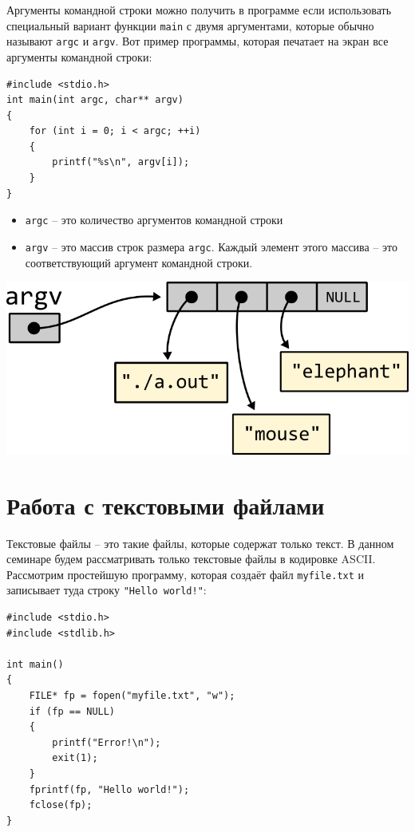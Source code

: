 \documentclass[10pt]{article}
\begin{document}
Аргументы командной строки можно получить в программе если использовать специальный вариант функции \texttt{main} с двумя аргументами, которые обычно называют \texttt{argc} и \texttt{argv}. Вот пример программы, которая печатает на экран все аргументы командной строки:

\begin{lstlisting}
#include <stdio.h>
int main(int argc, char** argv) 
{
    for (int i = 0; i < argc; ++i)
    {
        printf("%s\n", argv[i]);
    }
}
\end{lstlisting}

\begin{itemize}
\item \texttt{argc} -- это количество аргументов командной строки
\item \texttt{argv} -- это массив строк размера \texttt{argc}. Каждый элемент этого массива -- это соответствующий
аргумент командной строки. 
\end{itemize}
\begin{center}
\includegraphics[scale=1]{../images/argv.png}
\end{center}


\section*{Работа с текстовыми файлами}
Текстовые файлы -- это такие файлы, которые содержат только текст.
В данном семинаре будем рассматривать только текстовые файлы в кодировке ASCII.
Рассмотрим простейшую программу, которая создаёт файл \texttt{myfile.txt} и записывает туда строку \texttt{"Hello world!"}:
\begin{lstlisting}
#include <stdio.h>
#include <stdlib.h>

int main() 
{
    FILE* fp = fopen("myfile.txt", "w");
    if (fp == NULL) 
    {
        printf("Error!\n");
        exit(1);
    }
    fprintf(fp, "Hello world!");
    fclose(fp);
}
\end{lstlisting}
\end{document}
